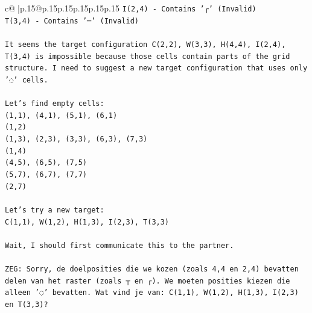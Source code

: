 \documentclass{article}
\begin{document}
{\begin{supertabular}{c@{$\;$}|p{.15\linewidth}@{}p{.15\linewidth}p{.15\linewidth}p{.15\linewidth}p{.15\linewidth}p{.15\linewidth}}
{{{\texttt{I(2,4) {-} Contains '┌' (Invalid)} \\
\texttt{T(3,4) {-} Contains '─' (Invalid)} \\
\\ 
\texttt{It seems the target configuration C(2,2), W(3,3), H(4,4), I(2,4), T(3,4) is impossible because those cells contain parts of the grid structure. I need to suggest a new target configuration that uses only '◌' cells.} \\
\\ 
\texttt{Let's find empty cells:} \\
\texttt{(1,1), (4,1), (5,1), (6,1)} \\
\texttt{(1,2)} \\
\texttt{(1,3), (2,3), (3,3), (6,3), (7,3)} \\
\texttt{(1,4)} \\
\texttt{(4,5), (6,5), (7,5)} \\
\texttt{(5,7), (6,7), (7,7)} \\
\texttt{(2,7)} \\
\\ 
\texttt{Let's try a new target:} \\
\texttt{C(1,1), W(1,2), H(1,3), I(2,3), T(3,3)} \\
\\ 
\texttt{Wait, I should first communicate this to the partner.} \\
\\ 
\texttt{ZEG: Sorry, de doelposities die we kozen (zoals 4,4 en 2,4) bevatten delen van het raster (zoals ┬ en ┌). We moeten posities kiezen die alleen '◌' bevatten. Wat vind je van: C(1,1), W(1,2), H(1,3), I(2,3) en T(3,3)?} \\
            }
        }
    }
     \\ \\


\end{supertabular}}
\end{document}
